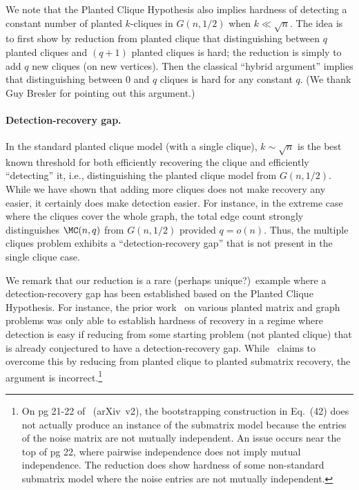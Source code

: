 \documentclass{article}
\begin{document}
\begin{remark}
We note that the Planted Clique Hypothesis also implies hardness of detecting a constant number of planted $k$-cliques in $G(n,1/2)$ when $k \ll \sqrt{n}$. The idea is to first show by reduction from planted clique that distinguishing between $q$ planted cliques and $(q+1)$ planted cliques is hard; the reduction is simply to add $q$ new cliques (on new vertices). Then the classical ``hybrid argument'' implies that distinguishing between $0$ and $q$ cliques is hard for any constant $q$. (We thank Guy Bresler for pointing out this argument.)
\end{remark}


\paragraph{Detection-recovery gap.}

In the standard planted clique model (with a single clique), $k \sim \sqrt{n}$ is the best known threshold for both efficiently recovering the clique and efficiently ``detecting'' it, i.e., distinguishing the planted clique model from $G(n,1/2)$. While we have shown that adding more cliques does not make recovery any easier, it certainly does make detection easier. For instance, in the extreme case where the cliques cover the whole graph, the total edge count strongly distinguishes $\MC(n,q)$ from $G(n,1/2)$ provided $q = o(n)$. Thus, the multiple cliques problem exhibits a ``detection-recovery gap'' that is not present in the single clique case.
 
We remark that our reduction is a rare (perhaps unique?)\ example where a detection-recovery gap has been established based on the Planted Clique Hypothesis. For instance, the prior work~\cite{BBH-reductions} on various planted matrix and graph problems was only able to establish hardness of recovery in a regime where detection is easy if reducing from some starting problem (not planted clique) that is already conjectured to have a detection-recovery gap. While~\cite{CLR-reduction} claims to overcome this by reducing from planted clique to planted submatrix recovery, the argument is incorrect.\footnote{On pg 21-22 of~\cite{CLR-reduction} (arXiv~v2), the bootstrapping construction in Eq.~(42) does not actually produce an instance of the submatrix model because the entries of the noise matrix are not mutually independent. An issue occurs near the top of pg 22, where pairwise independence does not imply mutual independence. The reduction does show hardness of some non-standard submatrix model where the noise entries are not mutually independent.}
 
\end{document}
